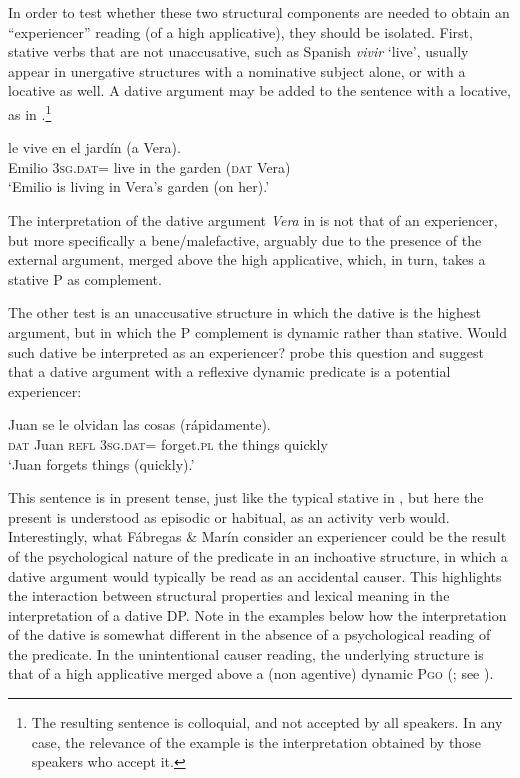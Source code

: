 \documentclass[output=paper,colorlinks,citecolor=brown,modfonts,nonflat]{langsci/langscibook}
\begin{document}
In order to test whether these two structural components are needed to obtain an “experiencer” reading (of a high applicative), they should be isolated. First, stative verbs that are not unaccusative, such as Spanish \textit{vivir} ‘live’, usually appear in unergative structures with a nominative subject alone, or with a locative as well. A dative argument may be added to the sentence with a locative, as in .\footnote{The resulting sentence is colloquial, and not accepted by all speakers. In any case, the relevance of the example is the interpretation obtained by those speakers who accept it.}

\ea%
    \label{ex:cuervo:20}
     {le} {vive} {en} {el} {jardín} ({a} {Vera}).\\
    Emilio 3\textsc{sg.dat}= live in the garden (\textsc{dat}  Vera)\\
    \glt ‘Emilio is living in Vera’s garden (on her).’
    \z

The interpretation of the dative argument \textit{Vera} in  is not that of an experiencer, but more specifically a bene/malefactive, arguably due to the presence of the external argument, merged above the high applicative, which, in turn, takes a stative {\liv}P as complement.

The other test is an unaccusative structure in which the dative is the highest argument, but in which the {\liv}P complement is dynamic rather than stative. Would such dative be interpreted as an experiencer?  probe this question and suggest that a dative argument with a reflexive dynamic predicate is a potential experiencer:

\ea%
    \label{ex:cuervo:21}
     {Juan} {se} {le} {olvidan} {las} {cosas} {(rápidamente)}.\\
    \textsc{dat} Juan  \textsc{refl} 3\textsc{sg.dat}= forget.\textsc{pl} the things quickly\\
    \glt ‘Juan forgets things (quickly).'
    \z

This sentence is in present tense, just like the typical stative in , but here the present is understood as episodic or habitual, as an activity verb would. Interestingly, what Fábregas \& Marín consider an experiencer could be the result of the psychological nature of the predicate in an inchoative structure, in which a dative argument would typically be read as an accidental causer. This highlights the interaction between structural properties and lexical meaning in the interpretation of a dative DP. Note in the examples below how the interpretation of the dative is somewhat different in the absence of a psychological reading of the predicate. In the unintentional causer reading, the underlying structure is that of a high applicative merged above a (non agentive) dynamic {\liv}P\textsc{go} (\citealt{Cuervo2003,Cuervo2014,Schäfer2008}; see ).
\end{document}

